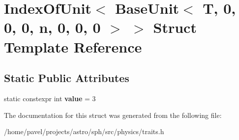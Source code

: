 \hypertarget{structIndexOfUnit_3_01BaseUnit_3_01T_00_010_00_010_00_010_00_01n_00_010_00_010_00_010_01_4_01_4}{}\section{Index\+Of\+Unit$<$ Base\+Unit$<$ T, 0, 0, 0, n, 0, 0, 0 $>$ $>$ Struct Template Reference}
\label{structIndexOfUnit_3_01BaseUnit_3_01T_00_010_00_010_00_010_00_01n_00_010_00_010_00_010_01_4_01_4}
\subsection*{Static Public Attributes}
\begin{DoxyCompactItemize}
\item 
\hypertarget{structIndexOfUnit_3_01BaseUnit_3_01T_00_010_00_010_00_010_00_01n_00_010_00_010_00_010_01_4_01_4_a00643bb1bc05d250c77bd398fee533eb}{}\label{structIndexOfUnit_3_01BaseUnit_3_01T_00_010_00_010_00_010_00_01n_00_010_00_010_00_010_01_4_01_4_a00643bb1bc05d250c77bd398fee533eb} 
static constexpr int {\bfseries value} = 3
\end{DoxyCompactItemize}


The documentation for this struct was generated from the following file\+:\begin{DoxyCompactItemize}
\item 
/home/pavel/projects/astro/sph/src/physics/traits.\+h\end{DoxyCompactItemize}
